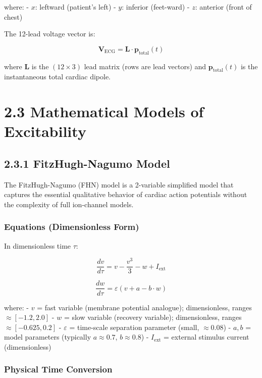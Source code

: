 \documentclass[12pt,oneside,a4paper]{book}
\begin{document}
where:
- $x$: leftward (patient's left)
- $y$: inferior (feet-ward)
- $z$: anterior (front of chest)

The 12-lead voltage vector is:

$$\mathbf{V}_{\text{ECG}} = \mathbf{L} \cdot \mathbf{p}_{\text{total}}(t)$$

where $\mathbf{L}$ is the $(12 \times 3)$ lead matrix (rows are lead vectors) and $\mathbf{p}_{\text{total}}(t)$ is the instantaneous total cardiac dipole.

\section{2.3 Mathematical Models of Excitability}

\subsection{2.3.1 FitzHugh-Nagumo Model}

The FitzHugh-Nagumo (FHN) model is a 2-variable simplified model that captures the essential qualitative behavior of cardiac action potentials without the complexity of full ion-channel models.

\subsubsection{Equations (Dimensionless Form)}

In dimensionless time $\tau$:

\begin{equation}
\frac{dv}{d\tau} = v - \frac{v^3}{3} - w + I_{\text{ext}}
\label{eq:fhn_v}
\end{equation}

\begin{equation}
\frac{dw}{d\tau} = \varepsilon (v + a - b \cdot w)
\label{eq:fhn_w}
\end{equation}

where:
- $v$ = fast variable (membrane potential analogue); dimensionless, ranges $\approx [-1.2, 2.0]$
- $w$ = slow variable (recovery variable); dimensionless, ranges $\approx [-0.625, 0.2]$
- $\varepsilon$ = time-scale separation parameter (small, $\approx 0.08$)
- $a, b$ = model parameters (typically $a \approx 0.7$, $b \approx 0.8$)
- $I_{\text{ext}}$ = external stimulus current (dimensionless)

\subsubsection{Physical Time Conversion}
\end{document}
